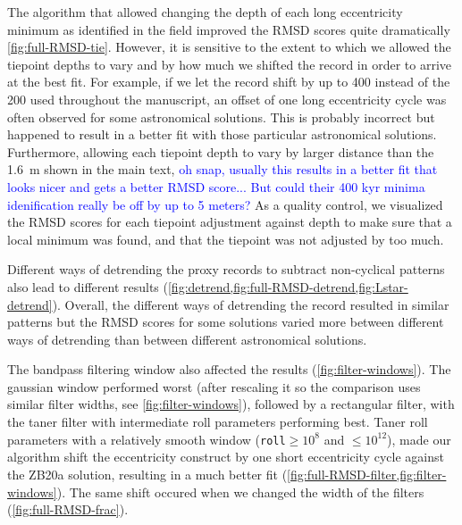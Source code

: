 \documentclass[draft]{agujournal2019}
\newcommand{\ijk}{\textcolor{blue}}
\begin{document}
The algorithm that allowed changing the depth of each long eccentricity minimum as identified in the field improved the \gls{RMSD} scores quite dramatically \cref{fig:full-RMSD-tie}.
However, it is sensitive to the extent to which we allowed the tiepoint depths to vary and by how much we shifted the record in order to arrive at the best fit.
For example, if we let the record shift by up to \qty{400}{\kiloyear} instead of the \qty{200}{\kiloyear} used throughout the manuscript, an offset of one long eccentricity cycle was often observed for some astronomical solutions.
This is probably incorrect but happened to result in a better fit with those particular astronomical solutions.
Furthermore, allowing each tiepoint depth to vary by larger distance than the \qty{1.6}{\metre} shown in the main text, \ijk{oh snap, usually this results in a better fit that looks nicer and gets a better RMSD score... But could their 400 kyr minima idenification really be off by up to 5 meters?}
As a quality control, we visualized the \gls{RMSD} scores for each tiepoint adjustment against depth to make sure that a local minimum was found, and that the tiepoint was not adjusted by too much.

Different ways of detrending the proxy records to subtract non-cyclical patterns also lead to different results (\cref{fig:detrend,fig:full-RMSD-detrend,fig:Lstar-detrend}).
Overall, the different ways of detrending the record resulted in similar patterns but the \gls{RMSD} scores for some solutions varied more between different ways of detrending than between different astronomical solutions.

The bandpass filtering window also affected the results (\cref{fig:filter-windows}).
The gaussian window performed worst (after rescaling it so the comparison uses similar filter widths, see \cref{fig:filter-windows}), followed by a rectangular filter, with the taner filter with intermediate roll parameters performing best.
Taner roll parameters with a relatively smooth window (\texttt{roll}\( \ge 10^{8}\) and \(\le 10^{12}\)), made our algorithm shift the eccentricity construct by one short eccentricity cycle against the ZB20a solution, resulting in a much better fit (\cref{fig:full-RMSD-filter,fig:filter-windows}).
The same shift occured when we changed the width of the filters (\cref{fig:full-RMSD-frac}).
\end{document}
